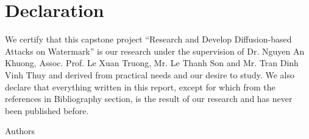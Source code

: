 \chapter*{Declaration}
We certify that this capstone project ``Research and Develop Diffusion-based Attacks on Watermark'' is our research under the supervision of Dr. Nguyen An Khuong, Assoc. Prof. Le Xuan Truong, Mr. Le Thanh Son and Mr. Tran Dinh Vinh Thuy and derived from practical needs and our desire to study. We also declare that everything written in this report, except for which from the references in Bibliography section, is the result of our research and has never been published before.

\null\hfill Authors